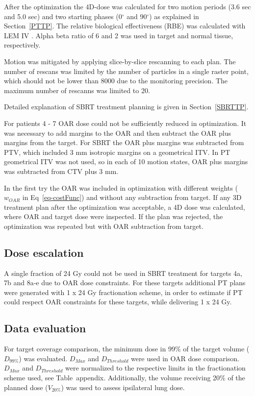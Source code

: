 After the optimization the 4D-dose was calculated for two motion periods (3.6 sec and 5.0 sec) and two starting phases (0$^\circ$ and 90$^\circ$) as explained in Section~\ref{PTTP}. 
The relative biological effectiveness (RBE) was calculated with LEM IV \cite{Elsaesser2010}. 
Alpha beta ratio of 6 and 2 was used in target and normal tissue, respectively.

Motion was mitigated by applying slice-by-slice rescanning to each plan. 
The number of rescans was limited by the number of particles in a single raster point, which should not be lower than 8000 due to the
monitoring precision. The maximum number of rescanns was limited to 20.

Detailed explanation of SBRT treatment planning is given in Section~\ref{SBRTTP}.

For patients 4 - 7 OAR dose could not be sufficiently reduced in optimization. It was necessary to add margins to the OAR and then 
subtract the OAR plus margins from the target. For SBRT the OAR plus margins was subtracted from PTV, which included 3 mm isotropic margins on a geometrical ITV. 
In PT geometrical ITV was not used, so in each of 10 motion states, OAR plus margins was subtracted from CTV plus 3 mm. 

In the first try the OAR was included in optimization with different weights ($w_{OAR}$ in Eq~\ref{eq-costFunc}) and without any subtraction from target. 
If any 3D treatment plan after the optimization was acceptable, a 4D dose was calculated, 
where OAR and target dose were inspected. If the plan was rejected, the optimization was repeated but with OAR subtraction from target. 



\subsection{Dose escalation}

A single fraction of 24 Gy could not be used in SBRT treatment for targets 4a, 7b and 8a-e due to OAR dose constraints. For these targets additional 
PT plans were generated with 1 x 24 Gy fractionation scheme, in order
to estimate if PT could respect OAR constraints for these targets, while delivering 1 x 24 Gy. 

\subsection{Data evaluation}

For target coverage comparison, the minimum dose in 99\% of the target volume ($D_{99\%}$) was evaluated. $D_{Max}$ and $D_{Threshold}$ were used in OAR dose comparison. $D_{Max}$ and $D_{Threshold}$ were normalized to the respective limits
in the fractionation scheme used, see Table~appendix. Additionally, the volume receiving 20\% of the planned dose ($V_{20\%}$) was used to assess ipsilateral lung dose.

